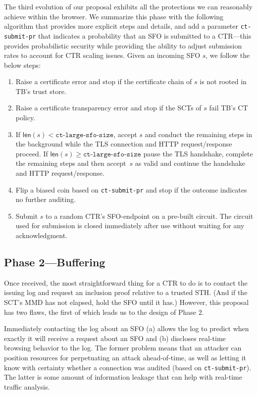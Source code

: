 The third evolution of our proposal exhibits all the protections we can reasonably achieve within the browser. We summarize this phase with the following algorithm that provides more explicit steps and details, and add a parameter \texttt{ct-submit-pr} that indicates a probability that an SFO is submitted to a CTR---this provides probabilistic security while providing the ability to adjust submission rates to account for CTR scaling issues. Given an incoming SFO $s$, we follow the below steps: %

\begin{enumerate}
    \item Raise a certificate error and stop if the certificate chain of $s$
        is not rooted in TB's trust store.
    \item Raise a certificate transparency error and stop if the SCTs of $s$
        fail TB's CT policy.
    \item If $\mathsf{len}(s) < \texttt{ct-large-sfo-size}$, accept $s$ and
        conduct the remaining steps in the background while the TLS connection
        and HTTP request/response proceed. If $\mathsf{len}(s) \geq \texttt{ct-large-sfo-size}$ pause the TLS handshake, complete the remaining steps and then
        accept~$s$ as valid and continue the handshake and HTTP request/response.
    \item Flip a biased coin based on \texttt{ct-submit-pr} and stop if the
        outcome indicates no further auditing.
    \item Submit $s$ to a random CTR's SFO-endpoint on a pre-built circuit.
        The circuit used for submission is closed immediately after use without
        waiting for any acknowledgment.
\end{enumerate}

\subsection{Phase 2---Buffering} \label{sec:base:phase2}

Once received, the most straightforward thing for a CTR to do is to contact the
issuing log and request an inclusion proof relative to a trusted STH\@. (And if the
SCT's MMD has not elapsed, hold the SFO until it has.) However, this proposal has
two flaws, the first of which leads us to the design of Phase 2.

Immediately contacting the log about an SFO (a) allows the log to predict when exactly
it will receive a request about an SFO and (b) discloses real-time browsing behavior
to the log. The former problem means that an attacker can position resources for
perpetuating an attack ahead-of-time, as well as letting it know with certainty whether a
connection was audited (based on \texttt{ct-submit-pr}). The latter is some amount
of information leakage that can help with real-time traffic analysis. 

